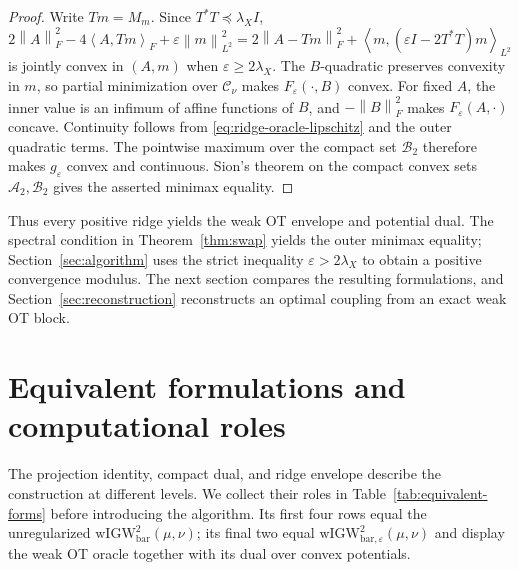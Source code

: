 \documentclass[11pt]{article}
\newcommand{\ip}[2]{\left\langle #1,#2\right\rangle}
\newcommand{\norm}[1]{\left\lVert #1\right\rVert}
\newcommand{\wIGW}{\mathrm{wIGW}_{\mathrm{bar}}}
\newcommand{\wIGWeps}{\mathrm{wIGW}_{\mathrm{bar},\varepsilon}}
\theoremstyle{plain}
\theoremstyle{definition}
\theoremstyle{remark}
\begin{document}
\begin{proof}
Write \(Tm=M_m\). Since \(T^*T\preceq\lambda_XI\),
\[
 2\norm A_F^2-4\ip{A}{Tm}_F+\varepsilon\norm m_{L^2}^2
 =2\norm{A-Tm}_F^2+
  \ip{m}{(\varepsilon I-2T^*T)m}_{L^2}
\]
is jointly convex in \((A,m)\) when
\(\varepsilon\ge2\lambda_X\). The \(B\)-quadratic preserves convexity in \(m\),
so partial minimization over \(\mathcal C_\nu\) makes
\(F_\varepsilon(\cdot,B)\) convex. For fixed \(A\), the inner value is an
infimum of affine functions of \(B\), and
\(-\norm B_F^2\) makes \(F_\varepsilon(A,\cdot)\) concave.
Continuity follows from \eqref{eq:ridge-oracle-lipschitz} and the outer
quadratic terms. The pointwise maximum over the compact set \(\mathcal B_2\)
therefore makes \(g_\varepsilon\) convex and continuous. Sion's theorem
\cite{Sion} on the compact convex sets
\(\mathcal A_2,\mathcal B_2\) gives the asserted minimax equality.
\end{proof}

Thus every positive ridge yields the weak OT envelope and potential dual. The
spectral condition in Theorem~\ref{thm:swap} yields the outer minimax equality;
Section~\ref{sec:algorithm} uses the strict inequality
\(\varepsilon>2\lambda_X\) to obtain a positive convergence modulus. The next
section compares the resulting formulations, and
Section~\ref{sec:reconstruction} reconstructs an optimal coupling from an exact
weak OT block.

\section{Equivalent formulations and computational roles}
\label{sec:equivalent-formulations}

The projection identity, compact dual, and ridge envelope describe the construction
at different levels. We collect their roles in
Table~\ref{tab:equivalent-forms} before introducing the algorithm. Its first four rows equal the
unregularized \(\wIGW^2(\mu,\nu)\); its final two equal
\(\wIGWeps^2(\mu,\nu)\) and display the weak OT oracle together with its dual
over convex potentials.
\end{document}
